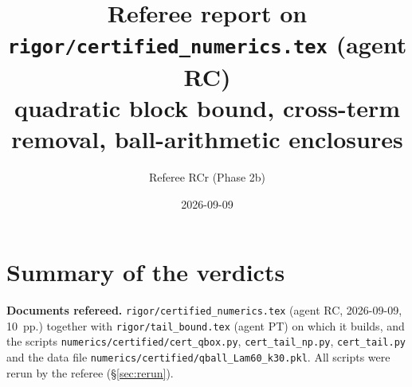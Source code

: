 \documentclass[11pt]{article}
\title{Referee report on \texttt{rigor/certified\_numerics.tex} (agent RC)\\
\large quadratic block bound, cross-term removal, ball-arithmetic enclosures}
\author{Referee RCr (Phase 2b)}
\date{2026-09-09}
\begin{document}
\maketitle

\section{Summary of the verdicts}\label{sec:summary}
\providecommand{\eps}{\varepsilon}\providecommand{\Fid}{F}\providecommand{\Tr}{\operatorname{Tr}}
\providecommand{\dd}{\mathrm{d}}\providecommand{\cF}{\mathcal F}
\newcommand{\Xo}{\Xi_0}\newcommand{\Xt}{\Xi_1}

\noindent\textbf{Documents refereed.} \texttt{rigor/certified\_numerics.tex} (agent RC, 2026-09-09,
10~pp.) together with \texttt{rigor/tail\_bound.tex} (agent PT) on which it builds, and the scripts
\texttt{numerics/certified/cert\_qbox.py}, \texttt{cert\_tail\_np.py}, \texttt{cert\_tail.py} and the
data file \texttt{numerics/certified/qball\_Lam60\_k30.pkl}.  All scripts were rerun by the referee
(\S\ref{sec:rerun}).
\end{document}

